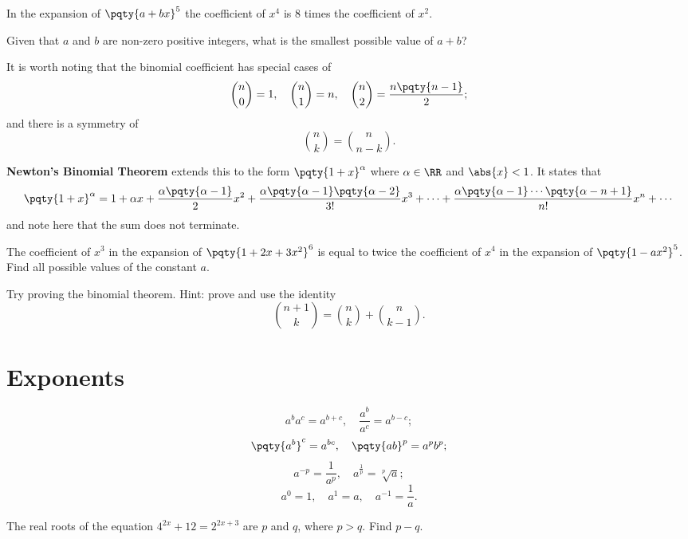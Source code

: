 \documentclass{article}
\begin{document}
\begin{example}[TMUA 2017 P1 Q13]
    In the expansion of \(\pqty{a + bx}^5\) the coefficient of \(x^4\) is \(8\) times the coefficient of \(x^2\).

    Given that \(a\) and \(b\) are non-zero positive integers, what is the smallest possible value of \(a + b\)?
\end{example}

It is worth noting that the binomial coefficient has special cases of
\[
    \binom{n}{0} = 1, \quad \binom{n}{1} = n, \quad \binom{n}{2} = \frac{n \pqty{n - 1}}{2};
\]
and there is a symmetry of
\[
    \binom{n}{k} = \binom{n}{n - k}.
\]  

\textbf{Newton's Binomial Theorem} extends this to the form \(\pqty{1 + x}^{\alpha}\) where \(\alpha \in \RR\) and \(\abs{x} < 1\). It states that
\[
    \pqty{1 + x}^{\alpha} = 1 + \alpha x + \frac{\alpha \pqty{\alpha - 1}}{2} x^2 + \frac{\alpha \pqty{\alpha - 1} \pqty{\alpha - 2}}{3!} x^3 + \cdots + \frac{\alpha \pqty{\alpha - 1} \cdots \pqty{\alpha - n + 1}}{n!} x^n + \cdots
\]
and note here that the sum does not terminate.

\begin{example}[TMUA 2016 P1 Q19]
    The coefficient of \(x^3\) in the expansion of \(\pqty{1 + 2x + 3 x^2}^6\) is equal to twice the coefficient of \(x^4\) in the expansion of \(\pqty{1 - a x^2}^5\). Find all possible values of the constant \(a\).
\end{example}

\begin{problem}
    Try proving the binomial theorem. Hint: prove and use the identity
    \[
        \binom{n + 1}{k} = \binom{n}{k} + \binom{n}{k - 1}.
    \]  
\end{problem}

\section{Exponents}

\[
    a^b a^c = a^{b + c}, \quad \frac{a^b}{a^c} = a^{b - c};
\]
\[
    \pqty{a^b}^c = a^{bc}, \quad \pqty{ab}^p = a^p b^p;
\]
\[
    a^{-p} = \frac{1}{a^p}, \quad a^{\frac{1}{p}} = \sqrt[p]{a};
\]
\[
    a^0 = 1, \quad a^1 = a, \quad a^{-1} = \frac{1}{a}.
\]

\begin{example}[TMUA 2016 P1 Q11]
    The real roots of the equation \(4^{2x} + 12 = 2^{2x + 3}\) are \(p\) and \(q\), where \(p > q\). Find \(p - q\).
\end{example}
\end{document}

